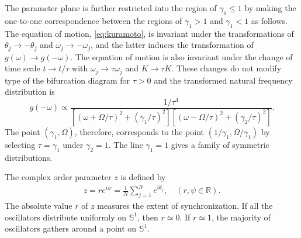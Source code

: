  The parameter plane is further restricted
  into the region of $\gamma_{1}\leq 1$
  by making the one-to-one correspondence between
  the regions of $\gamma_{1}>1$ and $\gamma_{1}<1$ as follows.
  The equation of motion, \eqref{eq:kuramoto},
  is invariant under the transformations of $\theta_{j}\to - \theta_{j}$
  and $\omega_{j} \to - \omega_{j}$,
  and the latter induces the transformation of $g(\omega)\to g(-\omega)$.
  The equation of motion is also invariant
  under the change of time scale $t\to t/\tau$ with
  $\omega_{j} \to \tau\omega_{j}$ and $K \to \tau K$.
  These changes do not modify type of the bifurcation diagram for $\tau>0$
  and the transformed natural frequency distribution is
  \begin{equation}
    g(-\omega) \propto \dfrac{1/\tau^{4}}{[(\omega+\Omega/\tau)^{2}+(\gamma_{1}/\tau)^{2}][(\omega-\Omega/\tau)^{2}+(\gamma_{2}/\tau)^{2}]}.
  \end{equation}
  The point $(\gamma_{1},\Omega)$, therefore, corresponds to
  the point $(1/\gamma_{1},\Omega/\gamma_{1})$
  by selecting $\tau=\gamma_{1}$ under $\gamma_{2}=1$.
The line $\gamma_{1}=1$ gives a family of symmetric distributions.

The complex order parameter $z$ is defined by
\begin{align}
  z=re^{i\psi}=\frac{1}{N}\sum_{j=1}^{N}e^{i\theta_{j}},
  \quad
  (r,\psi\in\mathbb{R}).
  \label{eq:order}
\end{align}
The absolute value $r$ of $z$ measures the extent of synchronization.
If all the oscillators distribute uniformly on $\mathbb{S}^{1}$,
then $r\simeq 0$.
If $r\simeq 1$, the majority of oscillators
gathers around a point on $\mathbb{S}^{1}$.

